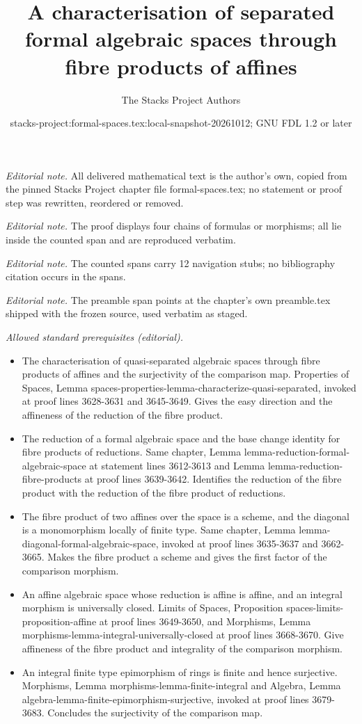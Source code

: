 \documentclass{stacks-project}
\title{A characterisation of separated formal algebraic spaces through fibre products of affines}
\author{The Stacks Project Authors}
\date{stacks-project:formal-spaces.tex:local-snapshot-20261012; GNU FDL 1.2 or later}
\theoremstyle{plain}
\theoremstyle{definition}
\theoremstyle{remark}
\numberwithin{equation}{subsection}
\begin{document}
\maketitle
\noindent\textit{Editorial note.} All delivered mathematical text is the author's own, copied from the pinned Stacks Project chapter file formal-spaces.tex; no statement or proof step was rewritten, reordered or removed.\par\medskip
\noindent\textit{Editorial note.} The proof displays four chains of formulas or morphisms; all lie inside the counted span and are reproduced verbatim.\par\medskip
\noindent\textit{Editorial note.} The counted spans carry 12 navigation stubs; no bibliography citation occurs in the spans.\par\medskip
\noindent\textit{Editorial note.} The preamble span points at the chapter's own preamble.tex shipped with the frozen source, used verbatim as staged.\par\medskip
\noindent\textit{Allowed standard prerequisites (editorial).}\begin{itemize}
\item The characterisation of quasi-separated algebraic spaces through fibre products of affines and the surjectivity of the comparison map. Properties of Spaces, Lemma spaces-properties-lemma-characterize-quasi-separated, invoked at proof lines 3628-3631 and 3645-3649. Gives the easy direction and the affineness of the reduction of the fibre product.
\item The reduction of a formal algebraic space and the base change identity for fibre products of reductions. Same chapter, Lemma lemma-reduction-formal-algebraic-space at statement lines 3612-3613 and Lemma lemma-reduction-fibre-products at proof lines 3639-3642. Identifies the reduction of the fibre product with the reduction of the fibre product of reductions.
\item The fibre product of two affines over the space is a scheme, and the diagonal is a monomorphism locally of finite type. Same chapter, Lemma lemma-diagonal-formal-algebraic-space, invoked at proof lines 3635-3637 and 3662-3665. Makes the fibre product a scheme and gives the first factor of the comparison morphism.
\item An affine algebraic space whose reduction is affine is affine, and an integral morphism is universally closed. Limits of Spaces, Proposition spaces-limits-proposition-affine at proof lines 3649-3650, and Morphisms, Lemma morphisms-lemma-integral-universally-closed at proof lines 3668-3670. Give affineness of the fibre product and integrality of the comparison morphism.
\item An integral finite type epimorphism of rings is finite and hence surjective. Morphisms, Lemma morphisms-lemma-finite-integral and Algebra, Lemma algebra-lemma-finite-epimorphism-surjective, invoked at proof lines 3679-3683. Concludes the surjectivity of the comparison map.
\end{itemize}\medskip
\end{document}

